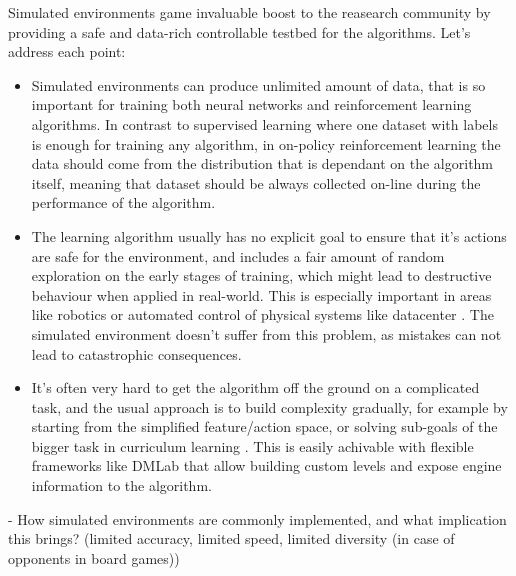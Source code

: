 Simulated environments game invaluable boost to the reasearch community by providing a
safe and data-rich controllable testbed for the algorithms. Let's address each point:
\begin{itemize}
    \item Simulated environments can produce unlimited amount of data, that is so important
    for training both neural networks and reinforcement learning algorithms. In contrast to
    supervised learning where one dataset with labels is enough for training any algorithm,
    in on-policy reinforcement learning the data should come from the distribution that is
    dependant on the algorithm itself, meaning that dataset should be always collected on-line
    during the performance of the algorithm.

    \item The learning algorithm usually has no explicit goal to ensure that it's actions are
    safe for the environment, and includes a fair amount of random exploration on the early
    stages of training, which might lead to destructive behaviour when applied in real-world.
    This is especially important in areas like robotics or automated control of physical systems
    like datacenter \cite{DrData}. The simulated environment doesn't suffer from this problem,
    as mistakes can not lead to catastrophic consequences.

    \item It's often very hard to get the algorithm off the ground on a complicated task,
    and the usual approach is to build complexity gradually, for example by starting from the
    simplified feature/action space, or solving sub-goals of the bigger task in curriculum
    learning \cite{Curriculum}. This is easily achivable with flexible frameworks like
    DMLab \cite{DMLab} that allow building custom levels and expose engine information to
    the algorithm.
\end{itemize}

- How simulated environments are commonly implemented, and what implication this brings?
(limited accuracy, limited speed, limited diversity (in case of opponents in board games))

